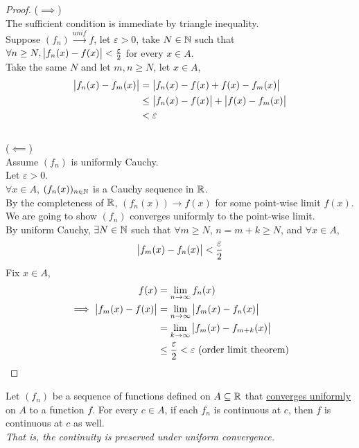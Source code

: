 \documentclass[11pt]{article}
\begin{document}
	\begin{proof}
		($\implies$)\\
		The sufficient condition is immediate by triangle inequality. \\
		Suppose $(f_n) \overset{unif}{\to} f$, let $\varepsilon > 0$, take $N \in \mathbb{N}$ such that $\forall n \geq N, \big \vert {f_n(x) - f(x)} \big \vert < \frac{\varepsilon}{2}$ for every $x \in A$. \\
		Take the same $N$ and let $m, n \geq N$, let $x \in A$,
		\begin{align}
			\big \vert {f_n(x) - f_m(x)} \big \vert &= \big \vert {f_n(x) - f(x) + f(x) - f_m(x)} \big \vert \\
			&\leq \big \vert {f_n(x) - f(x)} \big \vert + \big \vert {f(x) - f_m(x)} \big \vert \\
			&<\varepsilon
		\end{align} \\
		($\impliedby$) \\
		Assume $(f_n)$ is uniformly Cauchy. \\
		Let $\varepsilon > 0$. \\
		$\forall x \in A$, $(f_n(x))_{n \in \mathbb{N}}$ is a Cauchy sequence in $\mathbb{R}$. \\
		By the completeness of $\mathbb{R}$, $(f_n(x)) \to f(x)$ for some point-wise limit $f(x)$. \\
		We are going to show $(f_n)$ converges uniformly to the point-wise limit. \\
		By uniform Cauchy, $\exists N \in \mathbb{N}$ such that $\forall m \geq N$, $n = m+k \geq N$, and $\forall x \in A$,
		\begin{align}
			\big \vert {f_m(x) - f_n(x)} \big \vert < \frac{\varepsilon}{2}
		\end{align}
		Fix $x \in A$,
		\begin{align}
			f(x) &= \lim_{n \to \infty} f_n(x) \\
			\implies \big \vert {f_m(x) - f(x)} \big \vert &= \lim_{n \to \infty} \big \vert {f_m(x) - f_n(x)} \big \vert \\
			&= \lim_{k \to \infty} \big \vert {f_m(x) - f_{m+k}(x)} \big \vert \\
			&\leq \frac{\varepsilon}{2} < \varepsilon \text{{ (order limit theorem)}}
		\end{align}
	\end{proof}
	
	\begin{theorem}
		Let $(f_n)$ be a sequence of functions defined on $A \subseteq \mathbb{R}$ that \ul{converges uniformly} on $A$ to a function $f$. For every $c \in A$, if each $f_n$ is continuous at $c$, then $f$ is continuous at $c$ as well. \\
		\emph{That is, the continuity is preserved under uniform convergence.}
	\end{theorem}
	
\end{document}
